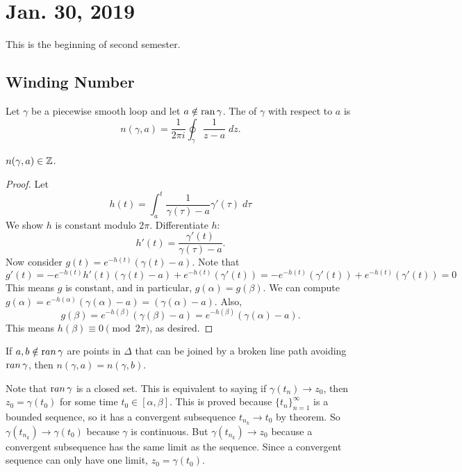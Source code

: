 \documentclass[notes]{subfile}
\begin{document}
\section{Jan. 30, 2019}
This is the beginning of second semester.

\subsection{Winding Number}

\begin{definition}
    Let $\gamma$ be a piecewise smooth loop and let
    $a \notin \operatorname{ran}{\gamma}$.
    The  of $\gamma$ with respect to $a$ is
    \[ n(\gamma, a) = \frac{1}{2\pi i} \oint_{\gamma} \frac{1}{z-a} \; dz. \]
\end{definition}

\begin{theorem}
    $n(\gamma, a) \in \operatorname{\mathbb{Z}}$.
\end{theorem}

\begin{proof}
    Let
    \[ h(t) = \int_a^t \frac{1}{\gamma(\tau)-a}\gamma'(\tau) \; d\tau \]
    We show $h$ is constant modulo $2\pi$.
    Differentiate $h$: 
    \[ h'(t) = \frac{\gamma'(t)}{\gamma(\tau) -a}. \]
    Now consider $g(t) = e^{-h(t)} (\gamma(t) - a)$.
    Note that
    \[ g'(t) = -e^{-h(t)} h'(t) (\gamma(t) - a) + 
        e^{-h(t)} (\gamma'(t))
    = -e^{-h(t)} (\gamma'(t)) +  e^{-h(t)} (\gamma'(t)) = 0 \]
    This means $g$ is constant, and in particular, $g(\alpha) = g(\beta)$.
    We can compute $g(\alpha) = e^{-h(\alpha)} (\gamma(\alpha) - a) = (\gamma(\alpha) - a)$.
    Also, 
    \[ g(\beta) = e^{-h(\beta)}(\gamma(\beta) - a) = e^{-h(\beta)}
    (\gamma(\alpha) - a). \]
    This means $h(\beta) \equiv 0 \pmod{2\pi}$, as desired. 
\end{proof}


\begin{cor}
    If $a,b \notin {\text ran} \,  \gamma$ are points in $\Delta$ that can be joined by a broken line path avoiding ${\text ran} \, \gamma$, then $n(\gamma, a) = n(\gamma, b)$.
\end{cor}

Note that ${\text ran} \, \gamma$ is a closed set.  
This is equivalent to saying if $\gamma (t_n) \to z_0$, then $z_0 = \gamma(t_0)$ for some time $t_0 \in [\alpha, \beta]$.
This is proved because $\{ t_n \}_{n=1}^{\infty}$ is a bounded sequence, so it has a convergent subsequence $t_{n_k} \to t_0$ by  theorem.
So $\gamma(t_{n_k}) \to \gamma(t_0)$ because $\gamma$ is continuous.
But $\gamma(t_{n_k}) \to z_0$ because a convergent subsequence has the same limit as the sequence.
Since a convergent sequence can only have one limit, $z_0 = \gamma(t_0)$.
\end{document}

